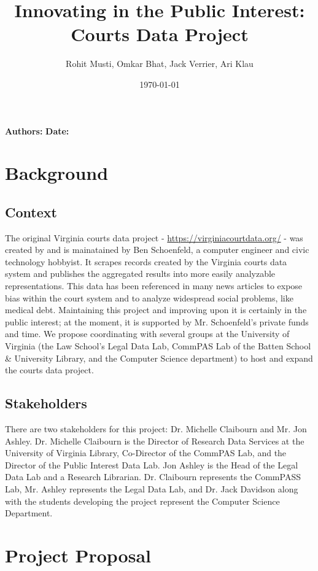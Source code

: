 \documentclass[12pt]{article}
\title{Innovating in the Public Interest: Courts Data Project}
\author{Rohit Musti, Omkar Bhat, Jack Verrier, Ari Klau}
\date{\today}
\renewcommand{\maketitle}{
    
    {\noindent\Large\bfseries\thetitle}

    \vspace{0.25em}
    {\noindent \textbf{Authors:} \theauthor} 
    {\noindent \textbf{Date:} \thedate}

}
\begin{document}
 

\maketitle

\section{Background}

\subsection{Context}

\noindent The original Virginia courts data project - \url{https://virginiacourtdata.org/}  -  was created by and is mainatained by Ben Schoenfeld, a computer engineer and civic technology hobbyist.
It scrapes records created by the Virginia courts data system and publishes the aggregated results into more easily analyzable representations.
This data has been referenced in many news articles to expose bias within the court system and to analyze widespread social problems, like medical debt.
Maintaining this project and improving upon it is certainly in the public interest; at the moment, it is supported by Mr. Schoenfeld's private funds and time.
We propose coordinating with several groups at the University of Virginia (the Law School's Legal Data Lab, CommPAS Lab of the Batten School \& University Library, and the Computer Science department) to host and expand the courts data project.

\subsection{Stakeholders}

\noindent There are two stakeholders for this project: Dr. Michelle Claibourn and Mr. Jon Ashley. 
Dr. Michelle Claibourn is the Director of Research Data Services at the University of Virginia Library, Co-Director of the CommPAS Lab, and the Director of the Public Interest Data Lab.
Jon Ashley is the Head of the Legal Data Lab and a Research Librarian.
Dr. Claibourn represents the CommPASS Lab, Mr. Ashley represents the Legal Data Lab, and Dr. Jack Davidson along with the students developing the project represent the Computer Science Department.

\section{Project Proposal}
\end{document}
